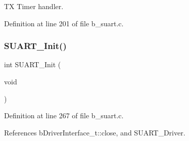 TX Timer handler. 



Definition at line 201 of file b\+\_\+suart.\+c.

\mbox{\label{group___s_u_a_r_t___exported___functions_ga4905cf58b8ed4c083969f3f9131e38ff}} 
\subsubsection{\texorpdfstring{S\+U\+A\+R\+T\+\_\+\+Init()}{SUART\_Init()}}
{\footnotesize\ttfamily int S\+U\+A\+R\+T\+\_\+\+Init (\begin{DoxyParamCaption}\item[{void}]{ }\end{DoxyParamCaption})}



Definition at line 267 of file b\+\_\+suart.\+c.



References b\+Driver\+Interface\+\_\+t\+::close, and S\+U\+A\+R\+T\+\_\+\+Driver.

